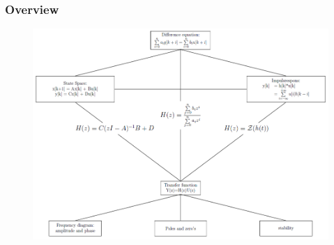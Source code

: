 \begin{frame}
	\frametitle{Overview}
	\begin{figure}
		\centering
		\includegraphics[width=0.7\linewidth]{Images/discrete_time_systems_28}
		\label{fig:discrete_time_systems_28}
	\end{figure}
\end{frame}
